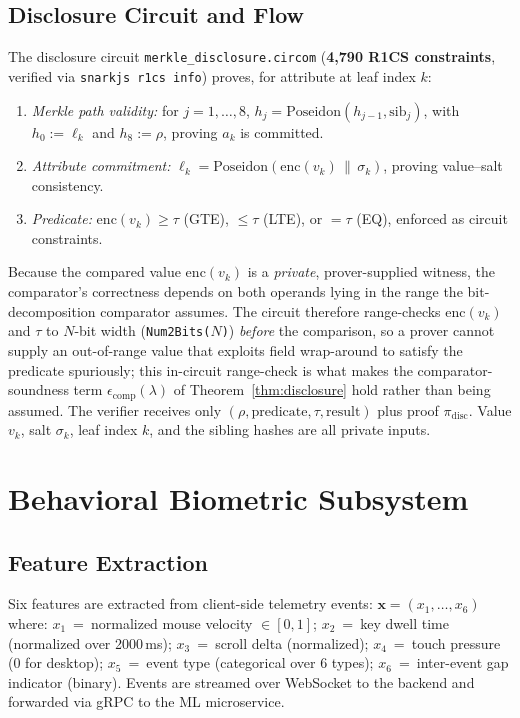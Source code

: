 \documentclass[journal,twoside,10pt]{IEEEtran}
\begin{document}
\subsection{Disclosure Circuit and Flow}
The disclosure circuit \texttt{merkle\_disclosure.circom} (\textbf{4{,}790
R1CS constraints}, verified via \texttt{snarkjs r1cs info}) proves, for
attribute at leaf index $k$:
\begin{enumerate}
  \item \textit{Merkle path validity:} for $j=1,\ldots,8$,
        $h_j = \mathrm{Poseidon}(h_{j-1}, \mathrm{sib}_j)$, with $h_0 := \ell_k$
        and $h_8 := \rho$, proving $a_k$ is committed.
  \item \textit{Attribute commitment:}
        $\ell_k = \mathrm{Poseidon}(\mathrm{enc}(v_k) \,\|\, \sigma_k)$,
        proving value--salt consistency.
  \item \textit{Predicate:}
        $\mathrm{enc}(v_k) \geq \tau$ (GTE), $\leq \tau$ (LTE),
        or $= \tau$ (EQ), enforced as circuit constraints.
\end{enumerate}
Because the compared value $\mathrm{enc}(v_k)$ is a \emph{private},
prover-supplied witness, the comparator's correctness depends on both
operands lying in the range the bit-decomposition comparator assumes. The
circuit therefore range-checks $\mathrm{enc}(v_k)$ and $\tau$ to
$N$-bit width (\texttt{Num2Bits($N$)}) \emph{before} the comparison, so a
prover cannot supply an out-of-range value that exploits field wrap-around
to satisfy the predicate spuriously; this in-circuit range-check is what
makes the comparator-soundness term $\epsilon_{\mathrm{comp}}(\lambda)$ of
Theorem~\ref{thm:disclosure} hold rather than being assumed.
The verifier receives only $(\rho, \text{predicate}, \tau, \text{result})$
plus proof $\pi_{\mathrm{disc}}$. Value $v_k$, salt $\sigma_k$, leaf index
$k$, and the sibling hashes are all private inputs.

\section{Behavioral Biometric Subsystem}
\label{sec:behavioral}

\subsection{Feature Extraction}
Six features are extracted from client-side telemetry events:
$\mathbf{x} = (x_1, \ldots, x_6)$ where:
$x_1$~=~normalized mouse velocity $\in [0,1]$;
$x_2$~=~key dwell time (normalized over 2000\,ms);
$x_3$~=~scroll delta (normalized);
$x_4$~=~touch pressure (0 for desktop);
$x_5$~=~event type (categorical over 6 types);
$x_6$~=~inter-event gap indicator (binary).
Events are streamed over WebSocket to the backend and forwarded via gRPC
to the ML microservice.
\end{document}
